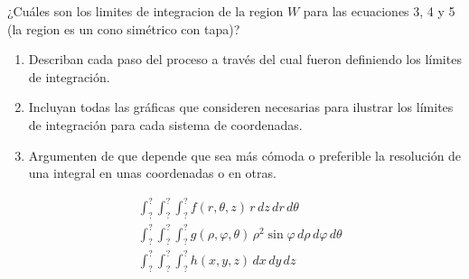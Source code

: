 \begin{ejercicio}
    ¿Cuáles son los limites de integracion de la region $W$ para las ecuaciones 3, 4 y 5 (la region es un cono simétrico con tapa)?

\begin{enumerate}
    \item[(a)] Describan cada paso del proceso a través del cual fueron definiendo los límites de integración.
    \item[(b)] Incluyan todas las gráficas que consideren necesarias para ilustrar los límites de integración para cada sistema de coordenadas.
    \item[(c)] Argumenten de que depende que sea más cómoda o preferible la resolución de una integral en unas coordenadas o en otras.
\end{enumerate}

\begin{align}
    &\int_{?}^{?} \int_{?}^{?} \int_{?}^{?} f(r, \theta, z)\, r\, dz\, dr\, d\theta \\
    &\int_{?}^{?} \int_{?}^{?} \int_{?}^{?} g(\rho, \varphi, \theta)\, \rho^2 \sin\varphi\, d\rho\, d\varphi\, d\theta \\
    &\int_{?}^{?} \int_{?}^{?} \int_{?}^{?} h(x, y, z)\, dx\, dy\, dz
\end{align}
\end{ejercicio}

